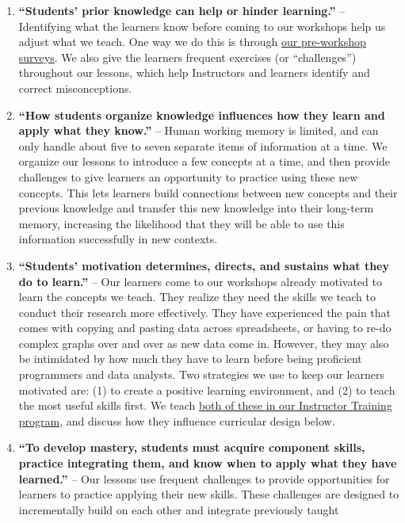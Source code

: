 \documentclass[
]{book}
\providecommand{\tightlist}{%
  \setlength{\itemsep}{0pt}\setlength{\parskip}{0pt}}
\begin{document}
\begin{enumerate}
\def\labelenumi{\arabic{enumi}.}
\tightlist
\item
  \textbf{``Students' prior knowledge can help or hinder learning.''} -- Identifying
  what the learners know before coming to our workshops help us adjust what we
  teach. One way we do this is through \href{https://carpentries.org/assessment/}{our pre-workshop surveys}. We also give the learners
  frequent exercises (or ``challenges'') throughout our lessons, which help Instructors
  and learners identify and correct misconceptions.
\item
  \textbf{``How students organize knowledge influences how they learn and apply what
  they know.''} -- Human working memory is limited, and can only handle about
  five to seven separate items of information at a time. We organize our lessons
  to introduce a few concepts at a time, and then provide challenges to give learners
  an opportunity to practice using these new concepts. This lets learners build connections
  between new concepts and their previous knowledge and transfer this new
  knowledge into their long-term memory,
  increasing the likelihood that they will be able to use this information successfully
  in new contexts.
\item
  \textbf{``Students' motivation determines, directs, and sustains what they do to
  learn.''} -- Our learners come to our workshops already motivated to learn the concepts
  we teach. They realize they need the skills we teach to conduct their
  research more effectively. They have experienced the pain that comes with
  copying and pasting data across spreadsheets, or having to re-do complex
  graphs over and over as new data come in. However, they may also be
  intimidated by how much they have to learn before being proficient
  programmers and data analysts. Two strategies we use to keep our
  learners motivated
  are: (1) to create a positive learning environment, and (2) to teach the most
  useful skills first. We teach \href{https://carpentries.github.io/instructor-training/08-motivation/index.html}{both of these in our Instructor Training program},
  and discuss how they influence curricular design below.
\item
  \textbf{``To develop mastery, students must acquire component skills, practice
  integrating them, and know when to apply what they have learned.''} --
  Our lessons use frequent challenges to provide
  opportunities for learners to practice applying their new skills. These challenges
  are designed to incrementally build on each other and integrate previously taught

\end{enumerate}
\end{document}
